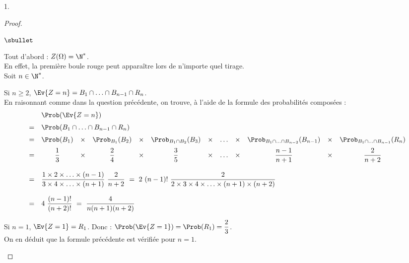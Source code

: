 \documentclass[11pt]{article}%
\begin{document}
\begin{noliste}{1.}
  \begin{proof}~    
    \begin{noliste}{$\sbullet$}
    \item Tout d'abord : $Z(\Omega) = \N^*$.\\
      En effet, la première boule rouge peut apparaître lors de
      n'importe quel tirage.\\
      Soit $n \in \N^*$.
    \item Si $n \geq 2$, $\Ev{Z = n} = B_1 \cap \ldots \cap B_{n-1}
      \cap R_n$.\\
      En raisonnant comme dans la question précédente, on trouve, à
      l'aide de la formule des probabilités composées :
      \[
      \begin{array}{cccccccccccc}
        & \multicolumn{11}{l}{\Prob(\Ev{Z = n})} \\[.2cm]
        = & \multicolumn{11}{l}{\Prob(B_1 \cap \ldots \cap B_{n-1}
          \cap R_n)} \\[.2cm] 
        = & \Prob(B_1) & \times & \Prob_{B_1}(B_2) & \times & \Prob_{B_1
          \cap B_2}(B_3) & \times & \ldots & \times & \Prob_{B_1 \cap 
	  \ldots
          \cap B_{n-2}}(B_{n-1}) & \times & \Prob_{B_1 \cap \ldots \cap
          B_{n-1}}(R_n) \\[.2cm]
        = & \dfrac{1}{3} & \times & \dfrac{2}{4} & \times & 
        \dfrac{3}{5} & \times & \ldots & \times & \dfrac{n-1}{n+1} & 
	\times &
        \dfrac{2}{n+2} \\[.6cm]
        = & \multicolumn{11}{l}{
          \dfrac{1 \times 2 \times \ldots \times
            (n-1)}{3 \times 4 \times \ldots \times (n+1)} \
          \dfrac{2}{n+2} \ = \ 2 \ (n-1)! \ \dfrac{2}{2 \times 3
            \times 4 \times \ldots \times (n+1) \times (n+2)}  
        } \\[.6cm]
        = & \multicolumn{11}{l}{
          4 \ \dfrac{(n-1)!}{(n+2)!} \ = \ \dfrac{4}{n(n+1)(n+2)}
        }
      \end{array}         
      \]
      
      \item Si $n = 1$, $\Ev{Z = 1} = R_1$. Donc : $\Prob(\Ev{Z = 1}) =
      \Prob(R_1) = \dfrac{2}{3}$.\\ 
      On en déduit que la formule précédente est 
      vérifiée pour $n=1$.
      





\end{noliste}
\end{proof}
\end{noliste}
\end{document}
